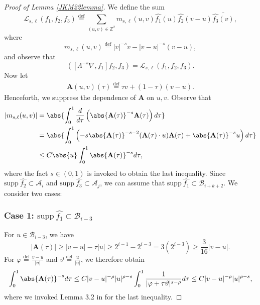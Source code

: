 \documentclass[twoside, reqno]{amsart}
\numberwithin{lemma}{section}
\numberwithin{theorem}{section}
\numberwithin{proposition}{section}
\numberwithin{equation}{section} %
\newcommand{\la}{\Lambda}
\newcommand{\lbn}{\left (}
\newcommand{\rbn}{\right )}
\begin{document}
\begin{proof}[Proof of Lemma \ref{JKM22lemma}]

    We define the sum
    \[ {\mathcal{L}}_{s,\ell}(f_1,f_2,f_3)\overset{\text{def}}{=}\sum_{(u,v)\in \mathbb{Z}^2}m_{s,\ell}(u,v)\widehat{f_1}(u)\widehat{f_2}(v-u)\overline{\widehat{f_3}(v)},
    \]
where 
\[m_{s,\ell}(u,v)\overset{\text{def}}{=}|v|^{-s}v-|v-u|^{-s}(v-u),\]
and observe that 
\[\lbn [\la^{-s}\nabla,f_1]f_2,f_3\rbn=\mathcal{L}_{s,\ell}(f_1,f_2,f_3).\]
Now let
    \begin{align}\label{def:A}
    \mathbf{A}(u,v)(\tau)\overset{\text{def}}{=}\tau v+(1-\tau)(v-u).
    \end{align}
Henceforth, we suppress the dependence of $\mathbf{A}$ on $u,v$. Observe that
    \begin{align}\label{E:meanvalue1}
        |m_{s,\ell}(u,v)|&=\abs{\int_{0}^{1}\frac{d}{{d\tau}}\left(\abs{\mathbf{A}(\tau)}^{-s}\mathbf{A}(\tau)\right)d\tau}\notag\\
        &=\abs{\int_{0}^{1}\left(-s\abs{\mathbf{A}(\tau)}^{-s-2}(\mathbf{A}(\tau)\cdot u)\mathbf{A}(\tau)+\abs{\mathbf{A}(\tau)}^{-s}u\right)d\tau}\notag\\
    &\le C\abs{u}\int_{0}^{1}\abs{\mathbf{A}(\tau)}^{-s}d\tau,
    \end{align}
where the fact $s\in(0,1)$ is invoked to obtain the last inequality. Since $\text{supp} \ \widehat{f_2}\subset \mathcal{A}_i$ and $\text{supp} \ \widehat{f_3}\subset \mathcal{A}_j$, we can assume that $\text{supp} \ \widehat{f_1}\subset \mathcal{B}_{i+k+2}$. We consider two cases: 
\subsubsection*{Case 1: $\text{supp} \ \widehat{f_1}\subset \mathcal{B}_{i-3}$}
For $u\in \mathcal{B}_{i-3}$, we have
\[|\mathbf{A}(\tau)|\ge |v-u|-\tau |u|\ge 2^{i-1}-2^{i-3}=3(2^{i-3})\ge \frac{3}{16}|v-u|.\]
For $\varphi\overset{\text{def}}{=}\frac{v-u}{|u|}$ and $\vartheta\overset{\text{def}}{=}\frac{u}{|u|}$, we therefore obtain 
\begin{align}\label{BoundEstimate1}
    \int_{0}^{1}\abs{\mathbf{A}(\tau)}^{-s}d\tau \le C |v-u|^{-\rho}|u|^{\rho-s}\int_{0}^{1}\frac{1}{|\varphi+\tau \vartheta |^{s-\rho}}d\tau
    \le C |v-u|^{-\rho}|u|^{\rho-s},
\end{align}
where we invoked Lemma 3.2 in \cite{JKM2022} for the last inequality. 

\end{proof}
\end{document}
